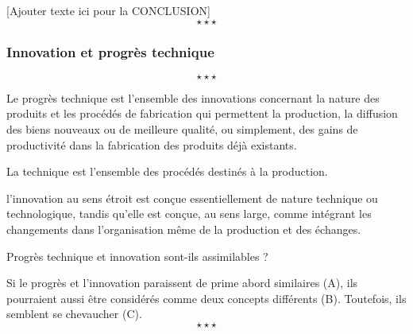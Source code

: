 {[Ajouter texte ici pour la CONCLUSION]} $$\star \star \star$$




\newpage \begin{center}
	\subsubsection*{Innovation et progrès technique}
\end{center}
$$\star \star \star$$


%


{Le progrès technique est l'ensemble des innovations concernant la nature des produits et les procédés de fabrication qui permettent la production, la diffusion des biens nouveaux ou de meilleure qualité, ou simplement, des gains de productivité dans la fabrication des produits déjà existants.}

La technique est l'ensemble des procédés destinés à la production.

l'innovation au sens étroit est conçue essentiellement de nature technique ou technologique, tandis qu'elle est conçue, au sens large, comme intégrant les changements dans l'organisation même de la production et des échanges.

Progrès technique et innovation sont-ils assimilables ?

Si le progrès et l'innovation paraissent de prime abord similaires (A), ils pourraient aussi être considérés comme deux concepts différents (B). Toutefois, ils semblent se chevaucher (C).$$\star \star \star$$

